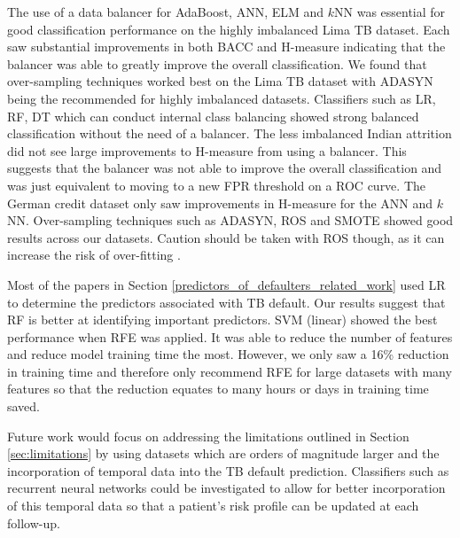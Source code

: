 \documentclass{sig-alternate-05-2015}
\begin{document}
	The use of a data balancer for AdaBoost, ANN, ELM and $k$NN was essential for good classification performance on the highly imbalanced Lima TB dataset. Each saw substantial improvements in both BACC and H-measure indicating that the balancer was able to greatly improve the overall classification. We found that over-sampling techniques worked best on the Lima TB dataset with ADASYN being the recommended for highly imbalanced datasets. Classifiers such as LR, RF, DT which can conduct internal class balancing showed strong balanced classification without the need of a balancer. The less imbalanced Indian attrition did not see large improvements to H-measure from using a balancer. This suggests that the balancer was not able to improve the overall classification and was just equivalent to moving to a new FPR threshold on a ROC curve. The German credit dataset only saw improvements in H-measure for the ANN and $k$NN. Over-sampling techniques such as ADASYN, ROS and SMOTE showed good results across our datasets. Caution should be taken with ROS though, as it can increase the risk of over-fitting \cite{Batista:2004:SBS:1007730.1007735}.
		
	Most of the papers in Section \ref{predictors_of_defaulters_related_work} used LR to determine the predictors associated with TB default. Our results suggest that RF is better at identifying important predictors. SVM (linear) showed the best performance when RFE was applied. It was able to reduce the number of features and reduce model training time the most. However, we only saw a 16\% reduction in training time and therefore only recommend RFE for large datasets with many features so that the reduction equates to many hours or days in training time saved.
	
	Future work would focus on addressing the limitations outlined in Section \ref{sec:limitations} by using datasets which are orders of magnitude larger and the incorporation of temporal data into the TB default prediction. Classifiers such as recurrent neural networks could be investigated to allow for better incorporation of this temporal data so that a patient's risk profile can be updated at each follow-up.
	
	
	
	
\end{document}
